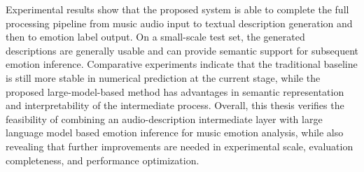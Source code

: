 \begin{abstracten}
Experimental results show that the proposed system is able to complete the full processing pipeline from music audio input to textual description generation and then to emotion label output. On a small-scale test set, the generated descriptions are generally usable and can provide semantic support for subsequent emotion inference. Comparative experiments indicate that the traditional baseline is still more stable in numerical prediction at the current stage, while the proposed large-model-based method has advantages in semantic representation and interpretability of the intermediate process. Overall, this thesis verifies the feasibility of combining an audio-description intermediate layer with large language model based emotion inference for music emotion analysis, while also revealing that further improvements are needed in experimental scale, evaluation completeness, and performance optimization.
\end{abstracten}